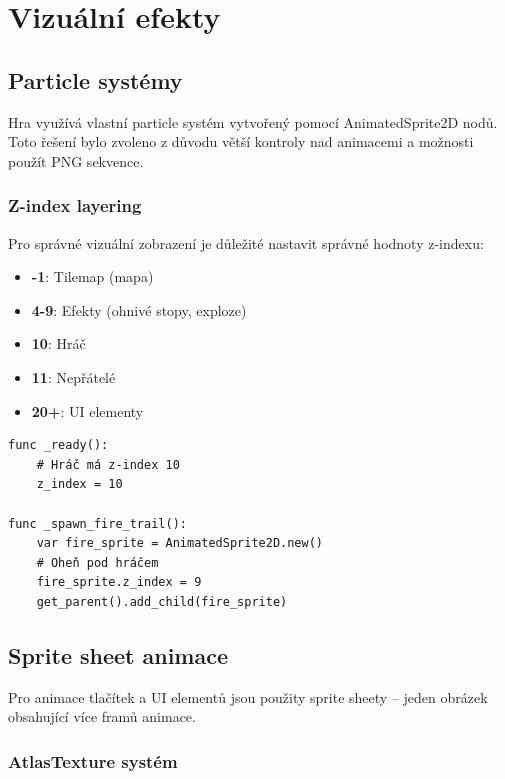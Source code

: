 \documentclass[12pt, a4paper,
oneside
]{report}
\begin{document}
	\chapter{Vizuální efekty}
	\nopagebreak
	
	\section{Particle systémy}
	\nopagebreak
	\nopagebreak
	
	Hra využívá vlastní particle systém vytvořený pomocí AnimatedSprite2D nodů. Toto řešení bylo zvoleno z důvodu větší kontroly nad animacemi a možnosti použít PNG sekvence.
	\nopagebreak
	
	\subsection{Z-index layering}
	\nopagebreak
	
	Pro správné vizuální zobrazení je důležité nastavit správné hodnoty z-indexu:
	\nopagebreak
	
	\begin{itemize}
		\item \textbf{-1}: Tilemap (mapa)
		\item \textbf{4-9}: Efekty (ohnivé stopy, exploze)
		\item \textbf{10}: Hráč
		\item \textbf{11}: Nepřátelé
		\item \textbf{20+}: UI elementy
	\end{itemize}

\begin{lstlisting}[style=GDScript, caption={Nastavení z-indexu}]
func _ready():
	# Hráč má z-index 10
	z_index = 10
	
func _spawn_fire_trail():
	var fire_sprite = AnimatedSprite2D.new()
	# Oheň pod hráčem
	fire_sprite.z_index = 9
	get_parent().add_child(fire_sprite)
\end{lstlisting}

	\section{Sprite sheet animace}
	\nopagebreak
	
	Pro animace tlačítek a UI elementů jsou použity sprite sheety -- jeden obrázek obsahující více framů animace.
	\nopagebreak
	
	\subsection{AtlasTexture systém}
	\nopagebreak
	
\end{document}
